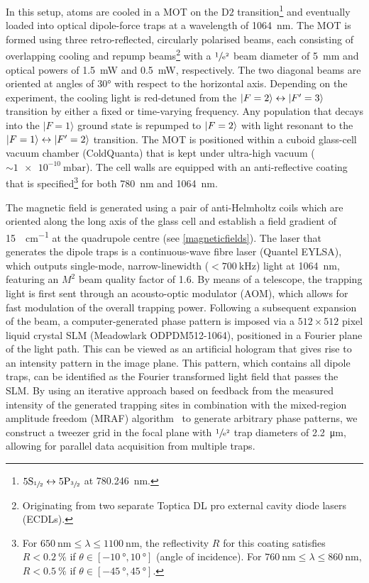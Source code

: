 \documentclass[../Thesis-IJspeert.tex]{subfiles}
\begin{document}
In this setup,  atoms are cooled in a MOT on the $\mathrm{D}2$ transition\footnote{$5\mathrm{S}_{\sfrac{1}{2}}  \leftrightarrow  5\mathrm{P}_{\sfrac{3}{2}}$ at \SI{780.246}{\nano\meter}.} and eventually loaded into optical dipole-force traps at a wavelength of \SI{1064}{\nano\meter}. The MOT is formed using three retro-reflected, circularly polarised beams, each consisting of overlapping cooling and repump beams\footnote{Originating from two separate Toptica DL pro external cavity diode lasers (ECDLs).} with a $\sfrac{1}{\mathrm{e}^2}$ beam diameter of \SI{5}{\milli\meter} and optical powers of \SI{1.5}{\milli\watt} and \SI{0.5}{\milli\watt}, respectively. The two diagonal beams are oriented at angles of \ang{30} with respect to the horizontal axis. Depending on the experiment, the cooling light is red-detuned from the $\ket{F=2}  \leftrightarrow \ket{F'=3}$ transition by either a fixed or time-varying frequency. Any population that decays into the $\lvert F=1\rangle$ ground state is repumped to $\ket{F=2}$ with light resonant to the $\ket{F=1}\leftrightarrow\ket{F'=2}$ transition. The MOT is positioned within a cuboid glass-cell vacuum chamber (ColdQuanta) that is kept under ultra-high vacuum ($\sim\!\SI{1e-10}{\milli\bar}$). The cell walls are equipped with an anti-reflective coating that is specified\footnote{For $\SI{650}{\nano\meter} \leq \lambda \leq \SI{1100}{\nano\meter}$, the reflectivity $R$ for this coating satisfies $R<\SI{0.2}{\percent}$ if $\theta \in [\SI{-10}{\degree}, \SI{10}{\degree}]$ (angle of incidence). For $\SI{760}{\nano\meter} \leq \lambda \leq \SI{860}{\nano\meter}$, $R<\SI{0.5}{\percent}$ if $\theta \in [\SI{-45}{\degree}, \SI{45}{\degree}]$.} for both \SI{780}{\nano\meter} and \SI{1064}{\nano\meter}.

The magnetic field is generated using a pair of anti-Helmholtz coils which are oriented along the long axis of the glass cell and establish a field gradient of \SI{15}{\gauss\per\centi\meter} at the quadrupole centre (see \autoref{magneticfields}). The laser that generates the dipole traps is a continuous-wave fibre laser (Quantel EYLSA), which outputs single-mode, narrow-linewidth ($<\SI{700}{\kilo\hertz}$) light at \SI{1064}{\nano\meter}, featuring an $M^2$ beam quality factor of \num{1.6}. By means of a telescope, the trapping light is first sent through an acousto-optic modulator (AOM), which allows for fast modulation of the overall trapping power. Following a subsequent expansion of the beam, a computer-generated phase pattern is imposed via a $512\times512$ pixel liquid crystal SLM (Meadowlark ODPDM512-1064), positioned in a Fourier plane of the light path. This can be viewed as an artificial hologram that gives rise to an intensity pattern in the image plane. This pattern, which contains all dipole traps, can be identified as the Fourier transformed light field that passes the SLM. By using an iterative approach based on feedback from the measured intensity of the generated trapping sites in combination with the mixed-region amplitude freedom (MRAF) algorithm~\cite{Pasienski2008} to generate arbitrary phase patterns, we construct a tweezer grid in the focal plane with $\sfrac{1}{\mathrm{e}^2}$ trap diameters of \SI{2.2}{\micro\meter}, allowing for parallel data acquisition from multiple traps.
\end{document}
